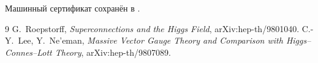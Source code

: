 Машинный сертификат сохранён в
.

\begin{thebibliography}{9}
G.~Roepstorff,
\emph{Superconnections and the Higgs Field},
arXiv:hep-th/9801040.
C.-Y.~Lee, Y.~Ne'eman,
\emph{Massive Vector Gauge Theory and Comparison with Higgs--Connes--Lott Theory},
arXiv:hep-th/9807089.
\end{thebibliography}